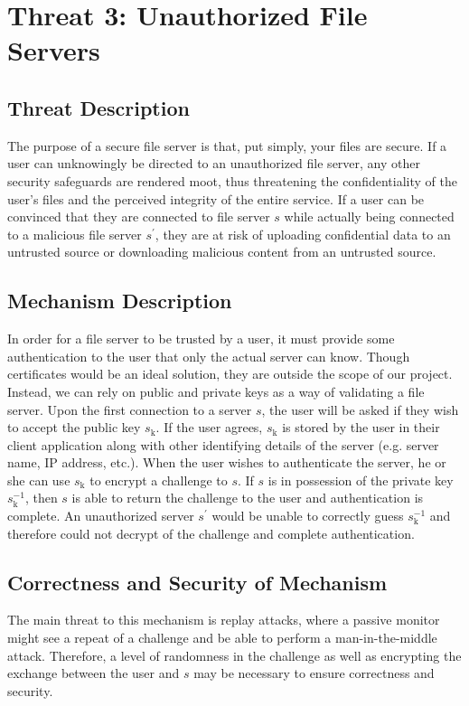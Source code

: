 \documentclass[11pt]{article}
\begin{document}
\section{Threat 3: Unauthorized File Servers}
\subsection{Threat Description}
The purpose of a secure file server is that, put simply, your files are secure. If a user can unknowingly be directed to an unauthorized file server, any other security safeguards are rendered moot, thus threatening the confidentiality of the user's files and the perceived integrity of the entire service. If a user can be convinced that they are connected to file server $s$ while actually being connected to a malicious file server $s^\prime$, they are at risk of uploading confidential data to an untrusted source or downloading malicious content from an untrusted source.
\subsection{Mechanism Description}
In order for a file server to be trusted by a user, it must provide some authentication to the user that only the actual server can know. Though certificates would be an ideal solution, they are outside the scope of our project. Instead, we can rely on public and private keys as a way of validating a file server. Upon the first connection to a server $s$, the user will be asked if they wish to accept the public key $s_\text{k}$. If the user agrees, $s_\text{k}$ is stored by the user in their client application along with other identifying details of the server (e.g. server name, IP address, etc.). When the user wishes to authenticate the server, he or she can use $s_\text{k}$ to encrypt a challenge to $s$. If $s$ is in possession of the private key $s_\text{k}^{-1}$, then $s$ is able to return the challenge to the user and authentication is complete. An unauthorized server $s^\prime$ would be unable to correctly guess $s_\text{k}^{-1}$ and therefore could not decrypt of the challenge and complete authentication.
\subsection{Correctness and Security of Mechanism}
The main threat to this mechanism is replay attacks, where a passive monitor might see a repeat of a challenge and be able to perform a man-in-the-middle attack. Therefore, a level of randomness in the challenge as well as encrypting the exchange between the user and $s$ may be necessary to ensure correctness and security.
\end{document}
